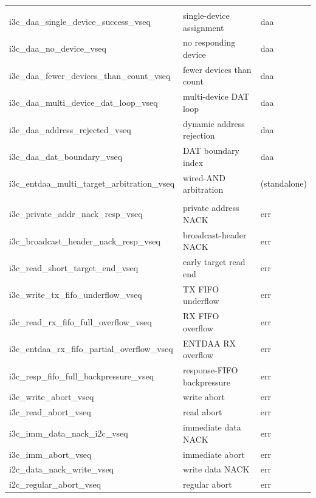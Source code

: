 {\begin{longtable}{@{}>{\ttfamily}l>{\raggedright\arraybackslash}p{}l@{}}
\midrule
\multicolumn{3}{@{}l}{\itshape ENTDAA / DAA --- \texttt{daa\_regression}} \\
i3c\_daa\_single\_device\_success\_vseq & single-device assignment      & daa \\
i3c\_daa\_no\_device\_vseq            & no responding device            & daa \\
i3c\_daa\_fewer\_devices\_than\_count\_vseq & fewer devices than count  & daa \\
i3c\_daa\_multi\_device\_dat\_loop\_vseq & multi-device DAT loop        & daa \\
i3c\_daa\_address\_rejected\_vseq     & dynamic address rejection       & daa \\
i3c\_daa\_dat\_boundary\_vseq         & DAT boundary index              & daa \\
i3c\_entdaa\_multi\_target\_arbitration\_vseq & wired-AND arbitration   & (standalone) \\
\midrule
\multicolumn{3}{@{}l}{\itshape Error / status / recovery --- \texttt{err\_regression}} \\
i3c\_private\_addr\_nack\_resp\_vseq   & private address NACK            & err \\
i3c\_broadcast\_header\_nack\_resp\_vseq & broadcast-header NACK         & err \\
i3c\_read\_short\_target\_end\_vseq   & early target read end           & err \\
i3c\_write\_tx\_fifo\_underflow\_vseq & TX FIFO underflow               & err \\
i3c\_read\_rx\_fifo\_full\_overflow\_vseq & RX FIFO overflow            & err \\
i3c\_entdaa\_rx\_fifo\_partial\_overflow\_vseq & ENTDAA RX overflow     & err \\
i3c\_resp\_fifo\_full\_backpressure\_vseq & response-FIFO backpressure  & err \\
i3c\_write\_abort\_vseq               & write abort                     & err \\
i3c\_read\_abort\_vseq                & read abort                      & err \\
i3c\_imm\_data\_nack\_i2c\_vseq       & \iic{} immediate data NACK      & err \\
i3c\_imm\_abort\_vseq                 & immediate abort                 & err \\
i2c\_data\_nack\_write\_vseq          & \iic{} write data NACK          & err \\
i2c\_regular\_abort\_vseq             & \iic{} regular abort            & err \\

\end{longtable}}
